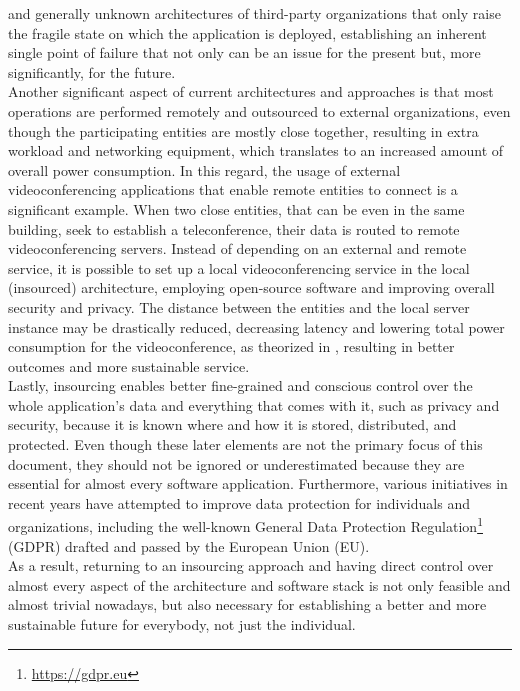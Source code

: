 and generally unknown architectures of third-party organizations that only raise
the fragile state on which the application is deployed, establishing an inherent
single point of failure that not only can be an issue for the present but, more significantly,
for the future. \\ %
Another significant aspect of current architectures and approaches is that most
operations are performed remotely and outsourced to external organizations, even
though the participating entities are mostly close together, resulting in extra
workload and networking equipment, which translates to an increased amount of overall
power consumption. In this regard, the usage of external videoconferencing applications
that enable remote entities to connect is a significant example. When two close
entities, that can be even in the same building, seek to establish a
teleconference, their data is routed to remote videoconferencing servers.
Instead of depending on an external and remote service, it is possible to set up
a local videoconferencing service in the local (insourced) architecture,
employing open-source software and improving overall security and privacy. The distance
between the entities and the local server instance may be drastically reduced,
decreasing latency and lowering total power consumption for the videoconference,
as theorized in \cite{comparison_energy_carbon_time_videoconferencing},
resulting in better outcomes and more sustainable service. \\ %
Lastly, insourcing enables better fine-grained and conscious control over the whole
application's data and everything that comes with it, such as privacy and
security, because it is known where and how it is stored, distributed, and protected.
Even though these later elements are not the primary focus of this document, they
should not be ignored or underestimated because they are essential for almost every
software application. Furthermore, various initiatives in recent years have attempted
to improve data protection for individuals and organizations, including the well-known
General Data Protection Regulation\footnote{\url{https://gdpr.eu}} (GDPR)
drafted and passed by the European Union (EU). \\ %
As a result, returning to an insourcing approach and having direct control over almost
every aspect of the architecture and software stack is not only feasible and almost
trivial nowadays, but also necessary for establishing a better and more
sustainable future for everybody, not just the individual.

